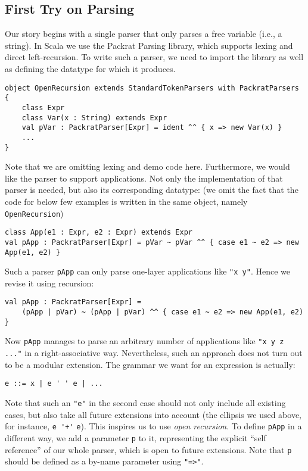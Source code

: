 \subsection{First Try on Parsing}\label{subsec:firsttry}

Our story begins with a single parser that only parses a free variable (i.e., a string). In Scala we use the Packrat Parsing
library, which supports lexing and direct left-recursion. To write such a parser, we need to import the library as
well as defining the datatype for which it produces.

\begin{lstlisting}
object OpenRecursion extends StandardTokenParsers with PackratParsers {
    class Expr
    class Var(x : String) extends Expr
    val pVar : PackratParser[Expr] = ident ^^ { x => new Var(x) }
    ...
}
\end{lstlisting}
Note that we are omitting lexing and demo code here. Furthermore, we would like the parser to support applications.
Not only the implementation of that parser is needed, but also its corresponding datatype: (we omit the fact that the code for below few
examples is written in the same object, namely \lstinline{OpenRecursion})
\begin{lstlisting}
class App(e1 : Expr, e2 : Expr) extends Expr
val pApp : PackratParser[Expr] = pVar ~ pVar ^^ { case e1 ~ e2 => new App(e1, e2) }
\end{lstlisting}
Such a parser \lstinline{pApp} can only parse one-layer applications like \lstinline{"x y"}. Hence we revise it using recursion:
\begin{lstlisting}
val pApp : PackratParser[Expr] =
    (pApp | pVar) ~ (pApp | pVar) ^^ { case e1 ~ e2 => new App(e1, e2) }
\end{lstlisting}
Now \lstinline{pApp} manages to parse an arbitrary number of applications like \lstinline{"x y z ..."} in a right-associative way.
Nevertheless, such an approach does not turn out to be a modular extension. The grammar we want for an expression is actually:
\begin{lstlisting}
e ::= x | e ' ' e | ...
\end{lstlisting}
Note that such an \lstinline{"e"} in the second case should not only include all existing cases, but also take all future extensions into account (the ellipsis we used above, for instance, \lstinline{e '+'} \lstinline{e}). This inspires us to use \textit{open recursion}. To define \lstinline{pApp} in a different way, we add a parameter \lstinline{p} to it, representing the explicit ``self reference'' of our whole parser, which is open to future extensions. Note that \lstinline{p} should be defined as a by-name parameter using \lstinline{"=>"}.

